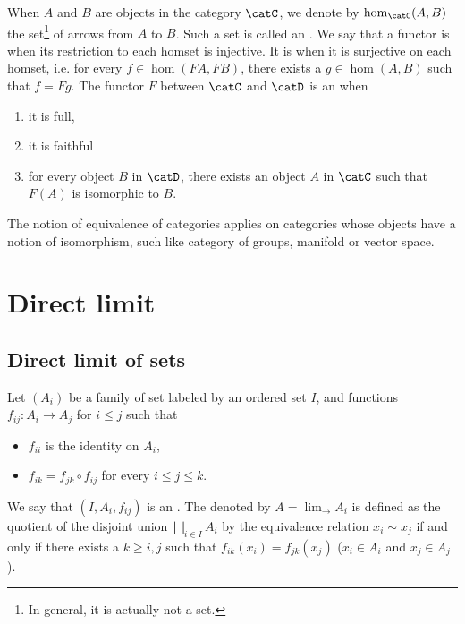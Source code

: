 When $A$ and $B$ are objects in the category $\catC$, we denote by $\hom_{\catC}(A,B)$ the set\footnote{In general, it is actually not a set.} of arrows from $A$ to $B$. Such a set is called an . We say that  a functor is  when its restriction to each homset is injective. It is  when it is surjective on each homset, i.e. for every $f\in \hom(FA,FB)$, there exists a $g\in \hom(A,B)$ such that $f=Fg$. The functor $F$ between $\catC$ and $\catD$ is an  when
\begin{enumerate}
\item it is full,
\item it is faithful
\item for every object $B$ in $\catD$, there exists an object $A$ in $\catC$ such that $F(A)$ is isomorphic to $B$.
\end{enumerate}
The notion of equivalence of categories applies on categories whose objects have a notion of isomorphism, such like category of groups, manifold or vector space.

\section{Direct limit}
\label{SecDirectLimit}

\subsection{Direct limit of sets}

Let $(A_i)$ be a family of set labeled by an ordered set $I$, and functions $f_{ij}\colon A_i\to A_j$ for $i\leq j$ such that
\begin{itemize}
\item $f_{ii}$ is the identity on $A_i$,
\item $f_{ik}=f_{jk}\circ f_{ij}$ for every $i\leq j\leq k$.
\end{itemize}
We say that $(I,A_i,f_{ij})$ is an . The  denoted by $A=\lim_{\rightarrow}A_i$ is defined as the quotient of the disjoint union $\bigsqcup_{i\in I}A_i$ by the equivalence relation $x_i\sim x_j$ if and only if there exists a $k\geq i,j$ such that $f_{ik}(x_i)=f_{jk}(x_j)$ ($x_i\in A_i$ and $x_j\in A_j$).

